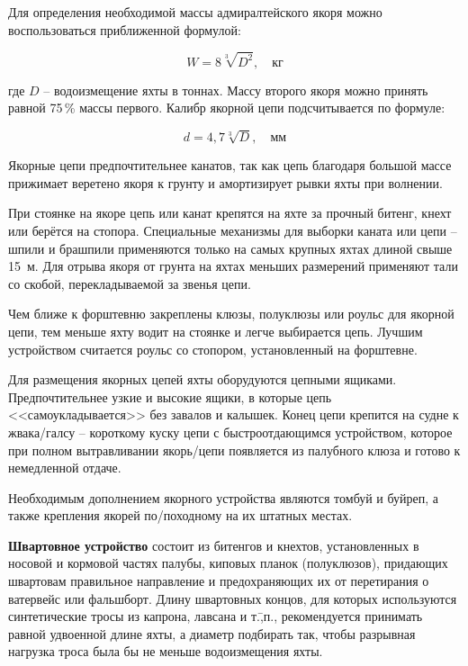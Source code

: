 Для определения необходимой массы адмиралтейского якоря можно
воспользоваться приближенной формулой:

\begin{equation}
  W = 8 \sqrt[3]{D^2}, \quad \text{кг}
\end{equation}

где $D$ \--- водоизмещение яхты в тоннах. Массу второго якоря можно
принять равной 75\,\% массы первого. Калибр якорной цепи
подсчитывается по формуле:

\begin{equation}
  d = 4,7 \sqrt[3]{D}, \quad \text{мм}
\end{equation}

Якорные цепи предпочтительнее канатов, так как цепь благодаря большой
массе прижимает веретено якоря к грунту и амортизирует рывки яхты при
волнении.

При стоянке на якоре цепь или канат крепятся на яхте за прочный
битенг, кнехт или берётся на стопора. Специальные механизмы для
выборки каната или цепи \--- шпили и брашпили применяются только на
самых крупных яхтах длиной свыше 15~м. Для отрыва якоря от грунта на
яхтах меньших размерений применяют тали со скобой, перекладываемой за
звенья цепи.

Чем ближе к форштевню закреплены клюзы, полуклюзы или роульс для
якорной цепи, тем меньше яхту водит на стоянке и легче выбирается
цепь. Лучшим устройством считается роульс со стопором, установленный
на форштевне.

Для размещения якорных цепей яхты оборудуются цепными
ящиками. Предпочтительнее узкие и высокие ящики, в которые цепь
<<самоукладывается>> без завалов и калышек. Конец цепи крепится на
судне к жвака\-/галсу \--- короткому куску цепи с быстроотдающимся
устройством, которое при полном вытравливании якорь\-/цепи появляется
из палубного клюза и готово к немедленной отдаче.

Необходимым дополнением якорного устройства являются томбуй и буйреп,
а также крепления якорей по\-/походному на их штатных местах.

\textbf{Швартовное устройство} состоит из
битенгов и кнехтов, установленных в носовой и кормовой частях палубы,
киповых планок (полуклюзов), придающих швартовам правильное
направление и предохраняющих их от перетирания о ватервейс или
фальшборт. Длину швартовных концов, для которых используются
синтетические тросы из капрона, лавсана и т.\=,п., рекомендуется
принимать равной удвоенной длине яхты, а диаметр подбирать так, чтобы
разрывная нагрузка троса была бы не меньше водоизмещения яхты.

